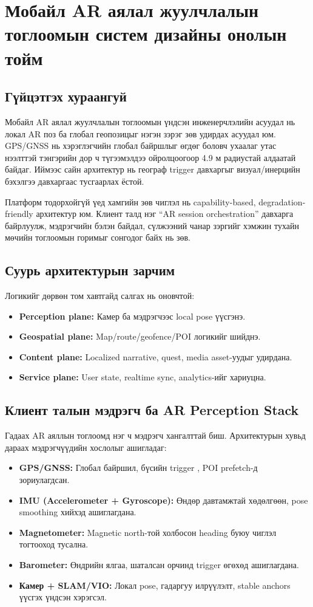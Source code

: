 \chapter*{Мобайл AR аялал жуулчлалын тоглоомын систем дизайны онолын тойм}
\begin{sloppy}

\section*{Гүйцэтгэх хураангуй}
Мобайл AR аялал жуулчлалын тоглоомын үндсэн инженерчлэлийн асуудал нь локал AR поз ба глобал геопозицыг нэгэн зэрэг зөв удирдах асуудал юм. GPS/GNSS нь хэрэглэгчийн глобал байршлыг өгдөг боловч ухаалаг утас нээлттэй тэнгэрийн дор ч түгээмэлдээ ойролцоогоор 4.9 м радиустай алдаатай байдаг. Иймээс сайн архитектур нь географ trigger давхаргыг визуал/инерцийн бэхэлгээ давхаргаас тусгаарлах ёстой.

Платформ тодорхойгүй үед хамгийн зөв чиглэл нь capability-based, degradation-friendly архитектур юм. Клиент талд нэг ``AR session orchestration'' давхарга байрлуулж, мэдрэгчийн бэлэн байдал, сүлжээний чанар зэргийг хэмжин тухайн мөчийн тоглоомын горимыг сонгодог байх нь зөв.

\section*{Суурь архитектурын зарчим}
Логикийг дөрвөн том хавтгайд салгах нь оновчтой:
\begin{itemize}
    \item \textbf{Perception plane:} Камер ба мэдрэгчээс local pose үүсгэнэ.
    \item \textbf{Geospatial plane:} Map/route/geofence/POI логикийг шийднэ.
    \item \textbf{Content plane:} Localized narrative, quest, media asset-уудыг удирдана.
    \item \textbf{Service plane:} User state, realtime sync, analytics-ийг хариуцна.
\end{itemize}

\section*{Клиент талын мэдрэгч ба AR Perception Stack}
Гадаах AR аяллын тоглоомд нэг ч мэдрэгч хангалттай биш. Архитектурын хувьд дараах мэдрэгчүүдийн хослолыг ашигладаг:
\begin{itemize}
    \item \textbf{GPS/GNSS:} Глобал байршил, бүсийн trigger , POI prefetch-д зориулагдсан.
    \item \textbf{IMU (Accelerometer + Gyroscope):} Өндөр давтамжтай хөдөлгөөн, pose smoothing хийхэд ашиглагдана.
    \item \textbf{Magnetometer:} Magnetic north-той холбосон heading буюу чиглэл тогтооход тусална.
    \item \textbf{Barometer:} Өндрийн ялгаа, шаталсан орчинд trigger өгөхөд ашиглагдана.
    \item \textbf{Камер + SLAM/VIO:} Локал pose, гадаргуу илрүүлэлт, stable anchors үүсгэх үндсэн хэрэгсэл.
\end{itemize}


\end{sloppy}
